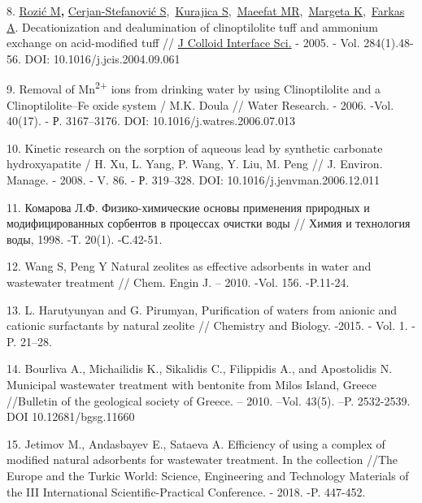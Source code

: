 8.
\href{https://www.ncbi.nlm.nih.gov/pubmed/?term=Rozi\%C4\%87\%20M\%5BAuthor\%5D&cauthor=true&cauthor_uid=15752783}{Rozić
M}{\bfseries ,}
\href{https://www.ncbi.nlm.nih.gov/pubmed/?term=Cerjan-Stefanovi\%C4\%87\%20S\%5BAuthor\%5D&cauthor=true&cauthor_uid=15752783}{Cerjan-Stefanović
S},~\href{https://www.ncbi.nlm.nih.gov/pubmed/?term=Kurajica\%20S\%5BAuthor\%5D&cauthor=true&cauthor_uid=15752783}{Kurajica
S},~\href{https://www.ncbi.nlm.nih.gov/pubmed/?term=Maeefat\%20MR\%5BAuthor\%5D&cauthor=true&cauthor_uid=15752783}{Maeefat
MR},~\href{https://www.ncbi.nlm.nih.gov/pubmed/?term=Margeta\%20K\%5BAuthor\%5D&cauthor=true&cauthor_uid=15752783}{Margeta
K},~\href{https://www.ncbi.nlm.nih.gov/pubmed/?term=Farkas\%20A\%5BAuthor\%5D&cauthor=true&cauthor_uid=15752783}{Farkas
A}. Decationization and dealumination of clinoptilolite tuff and
ammonium exchange on acid-modified tuff //
\href{https://www.ncbi.nlm.nih.gov/pubmed/15752783}{J Colloid Interface
Sci.} - 2005. - Vol. 284(1).48-56. DOI: 10.1016/j.jcis.2004.09.061

9. Removal of Mn\textsuperscript{2+} ions from drinking water by using
Clinoptilolite and a Clinoptilolite--Fe oxide system / M.K. Doula //
Water Research. - 2006. -Vol. 40(17). - Р. 3167--3176. DOI:
10.1016/j.watres.2006.07.013

10. Kinetic research on the sorption of aqueous lead by synthetic
carbonate hydroxyapatite / H. Xu, L. Yang, P. Wang, Y. Liu, M. Peng //
J. Environ. Manage. - 2008. - V. 86. - Р. 319--328. DOI:
10.1016/j.jenvman.2006.12.011

11. Комарова Л.Ф. Физико-химические основы применения природных и
модифицированных сорбентов в процессах очистки воды // Химия и
технология воды, 1998. -Т. 20(1). -С.42-51.

12. Wang S, Peng Y Natural zeolites as effective adsorbents in water and
wastewater treatment // Chem. Engin J. -- 2010. -Vol. 156. -P.11-24.

13. L. Harutyunyan and G. Pirumyan, Purification of waters from anionic
and cationic surfactants by natural zeolite // Chemistry and Biology.
-2015. - Vol. 1. - P. 21--28.

14. Bourliva A., Michailidis K., Sikalidis C., Filippidis A., and
Apostolidis N. Municipal wastewater treatment with bentonite from Milos
Island, Greece //Bulletin of the geological society of Greece. -- 2010.
--Vol. 43(5). --P. 2532-2539. DOI 10.12681/bgsg.11660

15. Jetimov M., Andasbayev E., Sataeva A. Efficiency of using a complex
of modified natural adsorbents for wastewater treatment. In the
collection //The Europe and the Turkic World: Science, Engineering and
Technology Materials of the III International Scientific-Practical
Conference. - 2018. -P. 447-452.

